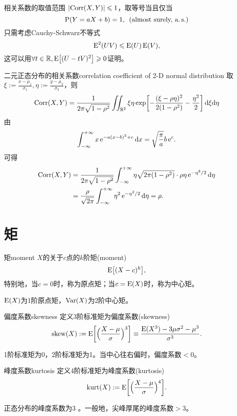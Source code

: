 \begin{theorem}{相关系数的取值范围}{}
	$\abs{\Corr(X,Y)}\leqslant 1$，取等号当且仅当
	\[
		\P(Y=aX+b)=1,\enspace(\text{almost~surely,~a.}\,\text{s.})
	\]
	只需考虑Cauchy-Schwarz不等式
	\begin{equation}
		\E^2(UV)\leqslant\E(U)\E(V),
	\end{equation}
	这可以用$\forall t\in\RR,\E\bigfkh{(U-tV)^2}\geqslant 0$证明。
\end{theorem}
\begin{example}{二元正态分布的相关系数}{correlation coefficient of 2-D normal distribution}
	取$\xi:=\frac{x-\mu_1}{\sigma_1},\eta:=\frac{y-\mu_2}{\sigma_2}$，则
	\[
		\Corr(X,Y)%
		=\frac1{2\pi\sqrt{1-\rho^2}}\iint_{\RR^2}\xi\eta\exp\biggfkh{-\frac{(\xi-\rho\eta)^2}{2(1-\rho^2)}-\frac{\eta^2}2}\d\xi\nd\eta
	\]
	由
	\[
		\int\iti x\e{-a(x-b)^2+c}\d x=\sqrt{\frac\pi{a}}b\e c.
	\]
	可得
	\begin{align*}
		\Corr(X,Y)&=\frac1{2\pi\sqrt{1-\rho^2}}\int\iti\eta\sqrt{2\pi(1-\rho^2)}\cdot\rho\eta\e{-\eta^2/2}\d\eta\\
		&=\frac\rho{\sqrt{2\pi}}\int\iti\eta^2\e{-\eta^2/2}\d\eta=\rho.
	\end{align*}
\end{example}

\section{矩}

\begin{definition}{矩}{moment}
	$X$的关于$c$点的$k$阶矩(moment)
	\begin{equation}
		\E\bigfkh{(X-c)^k},
	\end{equation}
	特别地，当$c=0$时，称为原点矩；当$c=\E(X)$时，称为中心矩。
\end{definition}
\begin{remark}
	$\E(X)$为1阶原点矩，$\Var(X)$为2阶中心矩。
\end{remark}
\begin{definition}{偏度系数}{skewness}
	定义3阶标准矩为偏度系数(skewness)
	\begin{equation}
		\label{eq:skewness}
		\mathrm{skew}(X):=\E\biggfkh{\Bigkh{\frac{X-\mu}\sigma}^3}
		\equiv\frac{\E(X^3)-3\mu\sigma^2-\mu^3}{\sigma^3}.
	\end{equation}
\end{definition}
1阶标准矩为0，2阶标准矩为1。当中心往右偏时，偏度系数$<0$。
\begin{definition}{峰度系数}{kurtosis}
	定义4阶标准矩为峰度系数(kurtosis)
	\begin{equation}
		\mathrm{kurt}(X):=\E\biggfkh{\Bigkh{\frac{X-\mu}\sigma}^4}.
	\end{equation}
\end{definition}
正态分布的峰度系数为3%
。一般地，尖峰厚尾的峰度系数$>3$。
